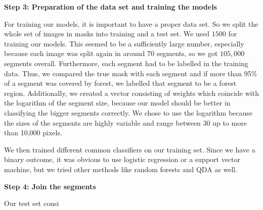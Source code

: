 \textbf{Step 3: Preparation of the data set and training the models}

For training our models, it is important to have a proper data set. So we split the whole set of images in masks into training and a test set. We used $1500$ for training our models. This seemed to be a sufficiently large number, especially because each image was split again in around $70$ segments, so we got $105,000$ segments overall. Furthermore, each segment had to be labelled in the training data. Thus, we compared the true mask with each segment and if more than 95\% of a segment was covered by forest, we labelled that segment to be a forest region. Additionally, we created a vector consisting of weights which coincide with the logarithm of the segment size, because our model should be better in classifying the bigger segments correctly. We chose to use the logarithm because the sizes of the segments are highly variable and range between 30 up to more than 10,000 pixels. 

We then trained different common classifiers on our training set. Since we have a binary outcome, it was obvious to use logistic regression or a support vector machine, but we tried other methods like random forests and QDA as well. 

\textbf{Step 4: Join the segments}

Our test set consi